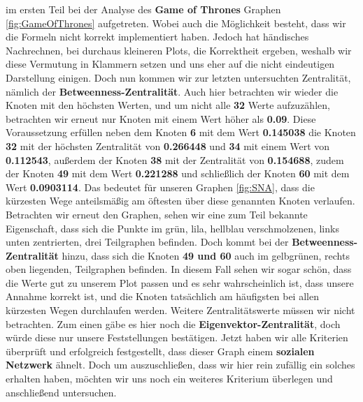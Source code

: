 im ersten Teil bei der Analyse des \textbf{Game of Thrones} Graphen \ref{fig:GameOfThrones} aufgetreten. Wobei auch die Möglichkeit besteht, dass wir die Formeln nicht korrekt implementiert haben. Jedoch hat händisches Nachrechnen, bei durchaus kleineren Plots, die Korrektheit ergeben, weshalb wir diese Vermutung in Klammern setzen und uns eher auf die nicht eindeutigen Darstellung einigen. Doch nun kommen wir zur letzten untersuchten Zentralität, nämlich der \textbf{Betweenness-Zentralität}. Auch hier betrachten wir wieder die Knoten mit den höchsten Werten, und um nicht alle \textbf{32} Werte aufzuzählen, betrachten wir erneut nur Knoten mit einem Wert höher als \textbf{0.09}. Diese Voraussetzung erfüllen neben dem Knoten \textbf{6} mit dem Wert \textbf{0.145038} die Knoten \textbf{32} mit der höchsten Zentralität von \textbf{0.266448} und \textbf{34} mit einem Wert von \textbf{0.112543}, außerdem der Knoten \textbf{38} mit der Zentralität von \textbf{0.154688}, zudem der Knoten \textbf{49} mit dem Wert \textbf{0.221288} und schließlich der Knoten \textbf{60} mit dem Wert \textbf{0.0903114}. Das bedeutet für unseren Graphen \ref{fig:SNA}, dass die kürzesten Wege anteilsmäßig am öftesten über diese genannten Knoten verlaufen. Betrachten wir erneut den Graphen, sehen wir eine zum Teil bekannte Eigenschaft, dass sich die Punkte im grün, lila, hellblau verschmolzenen, links unten zentrierten, drei Teilgraphen befinden. Doch kommt bei der \textbf{Betweenness-Zentralität} hinzu, dass sich die Knoten \textbf{49 und 60} auch im gelbgrünen, rechts oben liegenden, Teilgraphen befinden. In diesem Fall sehen wir sogar schön, dass die Werte gut zu unserem Plot passen und es sehr wahrscheinlich ist, dass unsere Annahme korrekt ist, und die Knoten tatsächlich am häufigsten bei allen kürzesten Wegen durchlaufen werden. Weitere Zentralitätswerte müssen wir nicht betrachten. Zum einen gäbe es hier noch die \textbf{Eigenvektor-Zentralität}, doch würde diese nur unsere Feststellungen bestätigen. Jetzt haben wir alle Kriterien überprüft und erfolgreich festgestellt, dass dieser Graph einem \textbf{sozialen Netzwerk} ähnelt. Doch um auszuschließen, dass wir hier rein zufällig ein solches erhalten haben, möchten wir uns noch ein weiteres Kriterium überlegen und anschließend untersuchen.


